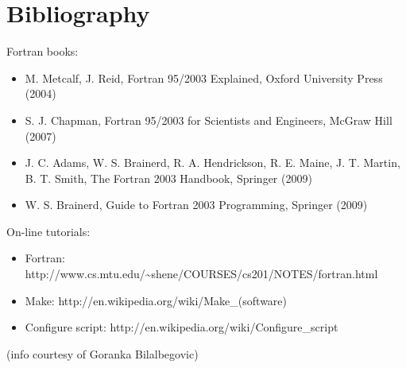 \documentclass[12pt,a4paper]{article}
\begin{document}
\section{Bibliography}

Fortran books:
\begin{itemize}
\item
M. Metcalf, J. Reid, Fortran 95/2003 Explained, Oxford University Press (2004)
\item
S. J. Chapman, Fortran 95/2003 for Scientists and Engineers, McGraw Hill (2007)
\item
J. C. Adams, W. S. Brainerd, R. A. Hendrickson, R. E. Maine, J. T. Martin,
B. T. Smith, The Fortran 2003 Handbook, Springer (2009)
\item
W. S. Brainerd, Guide to Fortran 2003 Programming, Springer (2009)
\end{itemize}
On-line tutorials:
\begin{itemize}
\item Fortran:
http://www.cs.mtu.edu/\~{}shene/COURSES/cs201/NOTES/fortran.html
\item Make:
http://en.wikipedia.org/wiki/Make\_(software)
\item Configure script:
http://en.wikipedia.org/wiki/Configure\_script
\end{itemize}
(info courtesy of Goranka Bilalbegovic)
\end{document}
